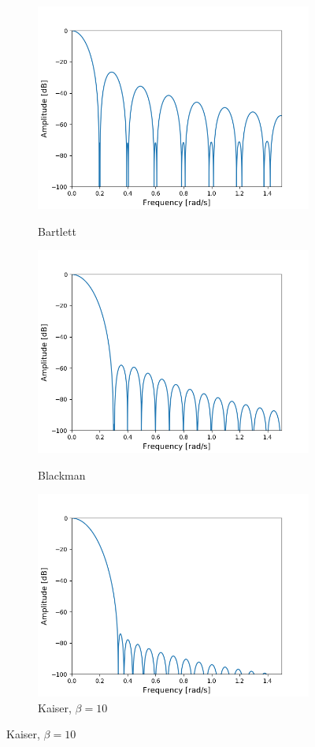 \begin{figure}[H]
\begin{subfigure}{0.49\textwidth}
\centering
\includegraphics[width=\textwidth]{figures/dbplots/stft_bilag/64/bartlett.png}
\caption{Bartlett}
\centering
\includegraphics[width=\textwidth]{figures/dbplots/stft_bilag/64/blackman.png}
\caption{Blackman}
\centering
\includegraphics[width=\textwidth]{figures/dbplots/stft_bilag/64/kaiser10.png}
\caption{Kaiser, $\beta=10$}
\end{subfigure}


\end{figure}
